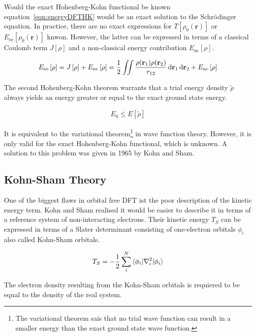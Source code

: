 Would the exact Hohenberg-Kohn functional be known
equation~\eqref{eqn:energyDFTHK} would be an exact solution to the
Schr\"odinger equation. In practice, there are no exact expressions for
$T\left[ \rho_0(\mathbf{r}) \right]$ or $E_\text{ee} \left[ \rho_0(
\mathbf{r}) \right]$ knwon. However, the latter can be expressed in terms of a
classical Coulomb term $J\left[\rho\right]$ and a non-classical energy contribution
$E_\text{nc}\left[\rho\right]$.

\begin{align}
    E_\text{ee} \left[ \rho \right]=J\left[\rho\right]+E_\text{nc}\left[\rho\right]=\frac{1}{2}\iint\frac{\rho(\mathbf{r}_1)\rho(\mathbf{r}_2)}{r_{12}}\dif\mathbf{r}_1\dif\mathbf{r}_2+E_\text{nc}\left[\rho\right]
\end{align}

The second Hohenberg-Kohn theorem warrants that a trial energy density
$\widetilde{\rho}$ always yields an energy greater or equal to the exact ground
state energy.

\begin{align}
    E_0 \leq E\left[\widetilde{\rho}\right]
\end{align}

It is equivalent to the variational theorem\footnote{The variational theorem
sais that no trial wave function can result in a smaller energy than the exact
ground state wave function.} in wave function theory. However, it is only valid
for the exact Hohenberg-Kohn functional, which is unknown. A solution to this
problem was given in 1965 by Kohn and Sham.

\subsection{Kohn-Sham Theory}
\label{sec:kohnshamtheory}

One of the biggest flaws in orbital free \ac{DFT} ist the poor description of
the kinetic energy term. Kohn and Sham realised it would be easier to describe
it in terms of a reference system of non-interacting electrons. Their kinetic
energy $T_S$ can be expressed in terms of a Slater determinant consisting of
one-electron orbitals $\phi_i$ also called Kohn-Sham orbitals.

\begin{align}
    T_S=-\frac{1}{2}\sum_i^N\braket{\phi_i|\nabla_i^2|\phi_i}
\end{align}

The electron density resulting from the Kohn-Sham orbitals is requiered to be
equal to the density of the real system.

